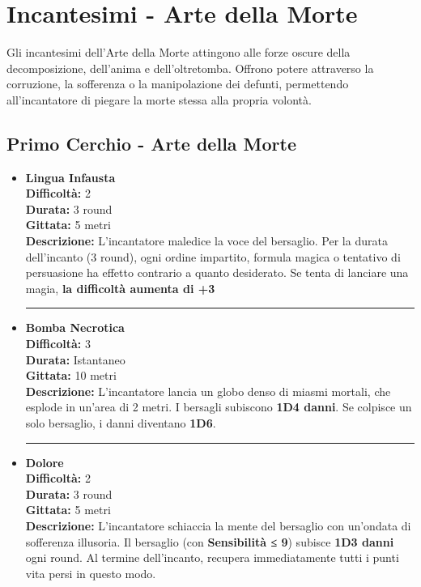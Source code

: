 \documentclass[./magie.tex]{subfiles}
\begin{document}
\section{Incantesimi - Arte della Morte}

Gli incantesimi dell'Arte della Morte attingono alle forze oscure della decomposizione, dell’anima e dell’oltretomba. Offrono potere attraverso la corruzione, la sofferenza o la manipolazione dei defunti, permettendo all'incantatore di piegare la morte stessa alla propria volontà.

 \subsection*{Primo Cerchio - Arte della Morte}

\begin{itemize}

\item \textbf{Lingua Infausta} \\
\textbf{Difficoltà:} 2 \\
\textbf{Durata:} 3 round \\
\textbf{Gittata:} 5 metri \\
\textbf{Descrizione:} L’incantatore maledice la voce del bersaglio. Per la durata dell’incanto (3 round), ogni ordine impartito, formula magica o tentativo di persuasione ha effetto contrario a quanto desiderato. Se tenta di lanciare una magia, \textbf{la difficoltà aumenta di +3}

\vspace{0.5cm}\rule{\textwidth}{0.4pt}\vspace{1cm}

\item \textbf{Bomba Necrotica} \\
\textbf{Difficoltà:} 3 \\
\textbf{Durata:} Istantaneo \\
\textbf{Gittata:} 10 metri \\
\textbf{Descrizione:} L'incantatore lancia un globo denso di miasmi mortali, che esplode in un’area di 2 metri. I bersagli subiscono \textbf{1D4 danni}. Se colpisce un solo bersaglio, i danni diventano \textbf{1D6}.

\vspace{0.5cm}\rule{\textwidth}{0.4pt}\vspace{1cm}
\clearpage
\item \textbf{Dolore} \\
\textbf{Difficoltà:} 2 \\
\textbf{Durata:} 3 round \\
\textbf{Gittata:} 5 metri \\
\textbf{Descrizione:} L’incantatore schiaccia la mente del bersaglio con un’ondata di sofferenza illusoria. Il bersaglio (con \textbf{Sensibilità ≤ 9}) subisce \textbf{1D3 danni} ogni round. Al termine dell’incanto, recupera immediatamente tutti i punti vita persi in questo modo.


\end{itemize}
\end{document}
